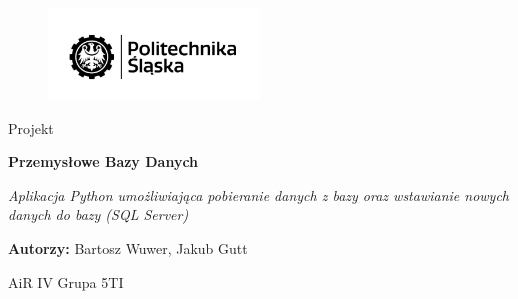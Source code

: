 \documentclass{article}
\begin{document}
\begin{titlepage}
    \centering
    \vspace*{1cm}
    \begin{figure}
        \centering 
        \includegraphics[width=0.5\textwidth]{logo.png}
    \end{figure}
    \Huge
    Projekt
    \par
    \textbf{Przemysłowe Bazy Danych}
    
    \vspace*{1cm}

    \vspace{0.5cm}
    \LARGE \textit{Aplikacja Python umożliwiająca pobieranie danych z bazy oraz wstawianie nowych danych do bazy (SQL Server)}
    
    \vspace{1.5cm}
    
    \textbf{Autorzy:} 
    Bartosz Wuwer,
    Jakub Gutt
    \vspace*{1.5cm}
    \par AiR IV Grupa 5TI
    
    \vfill
    
\end{titlepage}
\newpage

\tableofcontents

\newpage
\end{document}
